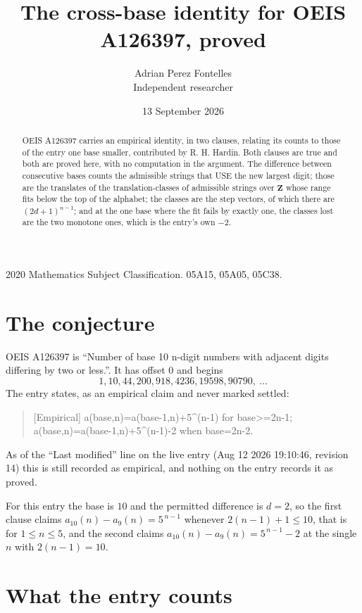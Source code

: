 \documentclass[11pt,a4paper]{article}
\title{The cross-base identity for OEIS A126397, proved}
\author{Adrian Perez Fontelles\\ \small Independent researcher}
\date{13 September 2026}
\theoremstyle{plain}
\theoremstyle{definition}
\begin{document}
\maketitle

\begin{abstract}
OEIS A126397 carries an empirical identity, in two clauses, relating its counts to those of the
entry one base smaller, contributed by R. H. Hardin. Both clauses are true and both are proved
here, with no computation in the argument. The difference between consecutive bases counts the
admissible strings that USE the new largest digit; those are the translates of the
translation-classes of admissible strings over $\mathbf{Z}$ whose range fits below the top of
the alphabet; the classes are the step vectors, of which there are $(2d+1)^{n-1}$; and at the
one base where the fit fails by exactly one, the classes lost are the two monotone ones, which
is the entry's own $-2$.
\end{abstract}

\noindent\small 2020 Mathematics Subject Classification. 05A15, 05A05, 05C38.\normalsize

\section{The conjecture}

OEIS A126397 is ``Number of base 10 n-digit numbers with adjacent digits differing by two or less.''. It has offset $0$ and begins
\[
1, 10, 44, 200, 918, 4236, 19598, 90790,\ \dots
\]
The entry states, as an empirical claim and never marked settled:
\begin{quote}
[Empirical] a(base,n)=a(base-1,n)+5\textasciicircum{}(n-1) for base>=2n-1; a(base,n)=a(base-1,n)+5\textasciicircum{}(n-1)-2 when base=2n-2.
\end{quote}
As of the ``Last modified'' line on the live entry (Aug 12 2026 19:10:46, revision 14)
this is still recorded as empirical, and nothing on the entry records it as proved.

For this entry the base is $10$ and the permitted difference is $d=2$, so the first clause
claims $a_{10}(n)-a_{9}(n)=5^{\,n-1}$ whenever $2(n-1)+1\le10$, that is for
$1\le n\le5$, and the second claims $a_{10}(n)-a_{9}(n)=5^{\,n-1}-2$ at the single
$n$ with $2(n-1)=10$.

\section{What the entry counts}
\end{document}
